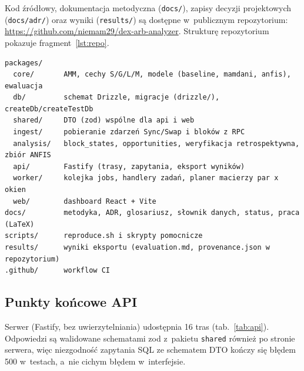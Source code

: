Kod źródłowy, dokumentacja metodyczna (\texttt{docs/}), zapisy decyzji projektowych
(\texttt{docs/adr/}) oraz wyniki (\texttt{results/}) są dostępne w~publicznym repozytorium:
\url{https://github.com/niemam29/dex-arb-analyzer}. Strukturę repozytorium pokazuje fragment~\ref{lst:repo}.
\begin{lstlisting}[caption={Struktura repozytorium}, label={lst:repo}]
packages/
  core/       AMM, cechy S/G/L/M, modele (baseline, mamdani, anfis), ewaluacja
  db/         schemat Drizzle, migracje (drizzle/), createDb/createTestDb
  shared/     DTO (zod) wspólne dla api i web
  ingest/     pobieranie zdarzeń Sync/Swap i bloków z RPC
  analysis/   block_states, opportunities, weryfikacja retrospektywna, zbiór ANFIS
  api/        Fastify (trasy, zapytania, eksport wyników)
  worker/     kolejka jobs, handlery zadań, planer macierzy par x okien
  web/        dashboard React + Vite
docs/         metodyka, ADR, glosariusz, słownik danych, status, praca (LaTeX)
scripts/      reproduce.sh i skrypty pomocnicze
results/      wyniki eksportu (evaluation.md, provenance.json w repozytorium)
.github/      workflow CI
\end{lstlisting}

\subsection{Punkty końcowe API}

Serwer (Fastify, bez uwierzytelniania) udostępnia 16 tras (tab.~\ref{tab:api}). Odpowiedzi są walidowane schematami
zod z~pakietu \texttt{shared} również po stronie serwera, więc niezgodność zapytania SQL ze
schematem DTO kończy się błędem 500 w~testach, a~nie cichym błędem w~interfejsie.

